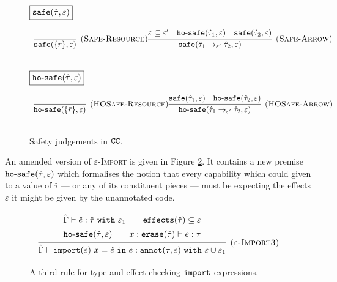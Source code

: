 \begin{figure}[h]

\noindent
$\fbox{$\mathtt{safe}(\hat \tau, \varepsilon)$}$

\[
\begin{array}{c}

\infer[\textsc{(Safe-Resource)}]
	{ \kwa{safe}(\{ \bar r \}, \varepsilon) }
	{} 
	
\infer[\textsc{(Safe-Arrow)}]
	{\kwa{safe}(\hat \tau_1 \rightarrow_{\varepsilon'} \hat \tau_2, \varepsilon)}
	{\varepsilon \subseteq \varepsilon' & \kwa{ho \hyphen safe}(\hat \tau_1, \varepsilon) & \kwa{safe}(\hat \tau_2, \varepsilon)} \\[3ex]

\end{array}
\]

\noindent
$\fbox{$\mathtt{ho \hbox{-} safe}(\hat \tau, \varepsilon)$}$

\[
\begin{array}{c}

\infer[\textsc{(HOSafe-Resource)}]
	{ \kwa{ho \hyphen safe}( \{ \bar r \}, \varepsilon)} 
	{}

\infer[\textsc{(HOSafe-Arrow)}]
	{ \kwa{ho \hyphen safe}( \hat \tau_1 \rightarrow_{\varepsilon'} \hat \tau_2, \varepsilon ) }
	{ \kwa{safe}(\hat \tau_1, \varepsilon)  & \kwa{ho \hyphen safe}(\hat \tau_2, \varepsilon) }\\[3ex]

\end{array}
\]

\vspace{-7pt}
\caption{Safety judgements in $\mathtt{CC}$.}
\label{fig:safe_defns}
\end{figure}

An amended version of \textsc{$\varepsilon$-Import} is given in Figure \ref{fig:import_rule3}. It contains a new premise $\mathtt{ho \hbox{-} safe}(\hat \tau, \varepsilon)$ which formalises the notion that every capability which could given to a value of $\hat \tau$ --- or any of its constituent pieces --- must be expecting the effects $\varepsilon$ it might be given by the unannotated code.

\begin{figure}[h]

\[
\begin{array}{c}

\infer[\textsc{($\varepsilon$-Import3)}]
	{ \hat \Gamma \vdash \kwa{import}(\varepsilon)~x = \hat e~\kw{in} e: \kwa{annot}(\tau, \varepsilon)~\kw{with} \varepsilon \cup \varepsilon_1 }
{{\def\arraystretch{1.4}
  \begin{array}{c}
\hat \Gamma \vdash \hat e: \hat \tau~\kw{with} \varepsilon_1
~~~~~~
\kwa{effects}(\hat \tau) \subseteq \varepsilon \\
\hosafe{\hat \tau}{\varepsilon} ~~~~~~ x: \kwa{erase}(\hat \tau) \vdash e: \tau
  \end{array}}} 
 
\end{array}
\]

\vspace{-7pt}
\caption{A third rule for type-and-effect checking $\mathtt{import}$ expressions.}
\label{fig:import_rule3}
\end{figure}

